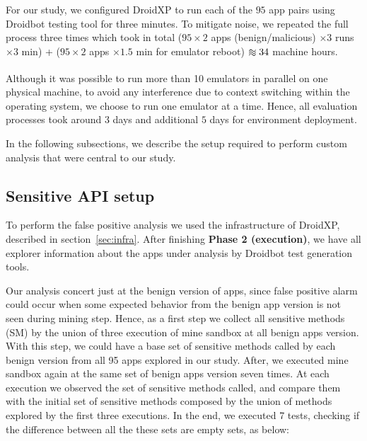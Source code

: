 For our study, we configured DroidXP to run each of the $95$ app pairs using Droidbot testing tool for three minutes. To mitigate noise, we repeated the full process three times which took in total ($95 \times 2$ apps (benign/malicious) $\times 3$ runs $\times 3$ min) + ($95 \times 2$ apps $\times 1.5$ min for emulator reboot) $\apeq 34$ machine hours.

Although it was possible to run more than 10 emulators in parallel on one physical machine, to avoid any interference due to context switching within the operating system, we choose to run one emulator at a time. Hence, all evaluation processes took around $3$ days and additional $5$ days for environment deployment.

In the following subsections, we describe the setup required to perform custom analysis that were central to our study.

\subsection{Sensitive API setup} \label{sec:sensitivapi}
To perform the false positive analysis we used the infrastructure of DroidXP, described in section~\ref{sec:infra}. After finishing \textbf{Phase 2 (execution)}, we have all explorer information about the apps under analysis by Droidbot test generation tools.

Our analysis concert just at the benign version of apps, since false positive alarm could occur when some expected behavior from the benign app version is not seen during mining step. Hence, as a first step we collect all sensitive methods (SM) by the union of three execution of mine sandbox at all benign apps version. With this step, we could have a base set of sensitive methods called by each benign version from all 95 apps explored in our study. After, we executed mine sandbox again at the same set of benign apps version seven times. At each execution we observed the set of sensitive methods called, and compare them with the initial set of sensitive methods composed by the union of methods explored by the first three executions. In the end, we executed 7 tests, checking if the difference between all the these sets are empty sets, as below:\newline

